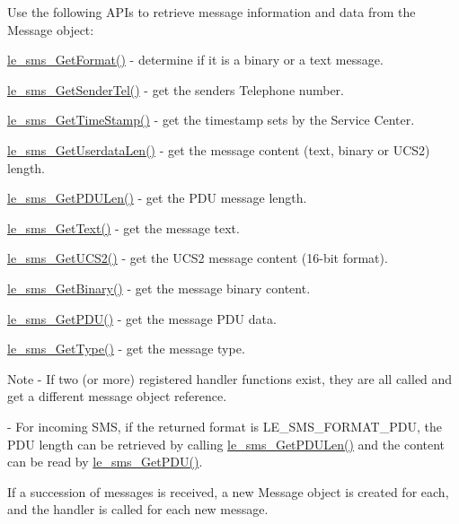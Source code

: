 Use the following A\+P\+Is to retrieve message information and data from the Message object\+:
\begin{DoxyItemize}
\item \hyperlink{le__sms__interface_8h_a5c2b8ce7043b4732c7b0ede7c5d7118c}{le\+\_\+sms\+\_\+\+Get\+Format()} -\/ determine if it is a binary or a text message.
\item \hyperlink{le__sms__interface_8h_aa4651e8dc97aa01df80ed6d9a7a486c6}{le\+\_\+sms\+\_\+\+Get\+Sender\+Tel()} -\/ get the sender\textquotesingle{}s Telephone number.
\item \hyperlink{le__sms__interface_8h_af018ca1bc2085a48e4b6d4691bef3cc7}{le\+\_\+sms\+\_\+\+Get\+Time\+Stamp()} -\/ get the timestamp sets by the Service Center.
\item \hyperlink{le__sms__interface_8h_a6165464dd3502b3c76b79b32206ba10f}{le\+\_\+sms\+\_\+\+Get\+Userdata\+Len()} -\/ get the message content (text, binary or U\+C\+S2) length.
\item \hyperlink{le__sms__interface_8h_abb89b302e564f3d55d604bb0c0dda022}{le\+\_\+sms\+\_\+\+Get\+P\+D\+U\+Len()} -\/ get the P\+DU message length.
\item \hyperlink{le__sms__interface_8h_aebf0c28efce6ec0b9616ffa8ecb80782}{le\+\_\+sms\+\_\+\+Get\+Text()} -\/ get the message text.
\item \hyperlink{le__sms__interface_8h_adafdc63a36a6a50c8e942bf69958789f}{le\+\_\+sms\+\_\+\+Get\+U\+C\+S2()} -\/ get the U\+C\+S2 message content (16-\/bit format).
\item \hyperlink{le__sms__interface_8h_af652a15437db583f333257ff5cef808d}{le\+\_\+sms\+\_\+\+Get\+Binary()} -\/ get the message binary content.
\item \hyperlink{le__sms__interface_8h_a77555788d56f73fa52f56904cd39cd2f}{le\+\_\+sms\+\_\+\+Get\+P\+D\+U()} -\/ get the message P\+DU data.
\item \hyperlink{le__sms__interface_8h_a2a63c6b5179025a80fb86c7f188e1eb7}{le\+\_\+sms\+\_\+\+Get\+Type()} -\/ get the message type.
\end{DoxyItemize}

\begin{DoxyNote}{Note}
-\/ If two (or more) registered handler functions exist, they are all called and get a different message object reference.

-\/ For incoming S\+MS, if the returned format is L\+E\+\_\+\+S\+M\+S\+\_\+\+F\+O\+R\+M\+A\+T\+\_\+\+P\+DU, the P\+DU length can be retrieved by calling \hyperlink{le__sms__interface_8h_abb89b302e564f3d55d604bb0c0dda022}{le\+\_\+sms\+\_\+\+Get\+P\+D\+U\+Len()} and the content can be read by \hyperlink{le__sms__interface_8h_a77555788d56f73fa52f56904cd39cd2f}{le\+\_\+sms\+\_\+\+Get\+P\+D\+U()}.
\end{DoxyNote}
If a succession of messages is received, a new Message object is created for each, and the handler is called for each new message.

